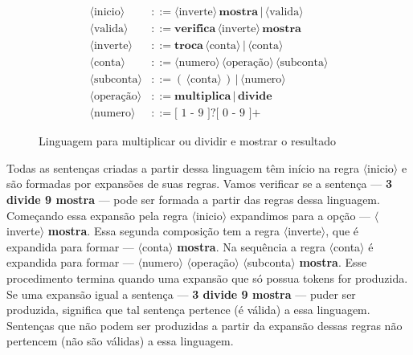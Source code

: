 \begin{figure}[H]
\begin{framed}
\begin{center}
\begin{align*}
\langle \text{inicio} \rangle &::= \langle \text{inverte} \rangle \, \mathbf{mostra} \, | \, \langle \text{valida} \rangle\\	
\langle \text{valida} \rangle &::= \mathbf{verifica} \, \langle \text{inverte} \rangle \, \mathbf{mostra}\\
\langle \text{inverte} \rangle &::= \mathbf{troca} \, \langle \text{conta} \rangle \, | \, \langle \text{conta} \rangle\\
\langle \text{conta} \rangle &::= \langle \text{numero} \rangle \, \langle \text{operação} \rangle \, \langle \text{subconta} \rangle\\
\langle \text{subconta} \rangle &::= ( \, \langle \text{conta} \rangle \, ) \, | \, \langle \text{numero} \rangle\\
\langle \text{operação} \rangle &::= \mathbf{multiplica} \, | \, \mathbf{divide}\\
\langle \text{numero} \rangle &::= \text{[ 1 - 9 ]?[ 0 - 9 ]+}
\end{align*}
\end{center}
\end{framed} 
\caption{Linguagem para multiplicar ou dividir e mostrar o resultado}
\label{fig:calculadora}
\end{figure}

Todas as sentenças criadas a partir dessa linguagem têm início na regra $\langle$inicio$\rangle$ e são formadas por expansões de suas regras. Vamos verificar se a sentença --- \textbf{3 divide 9 mostra} --- pode ser formada a partir das regras dessa linguagem. Começando essa expansão pela regra $\langle$inicio$\rangle$ expandimos para a opção --- $\langle$inverte$\rangle$ \textbf{mostra}. Essa segunda composição tem a regra $\langle$inverte$\rangle$, que é expandida para formar --- $\langle$conta$\rangle$ \textbf{mostra}. Na sequência a regra $\langle$conta$\rangle$ é expandida para formar --- $\langle$numero$\rangle$ $\langle$operação$\rangle$ $\langle$subconta$\rangle$ \textbf{mostra}. Esse procedimento termina quando uma expansão que só possua tokens for produzida. Se uma expansão igual a sentença --- \textbf{3 divide 9 mostra} --- puder ser produzida, significa que tal sentença pertence (é válida) a essa linguagem. Sentenças que não podem ser produzidas a partir da expansão dessas regras não pertencem (não são válidas) a essa linguagem.

